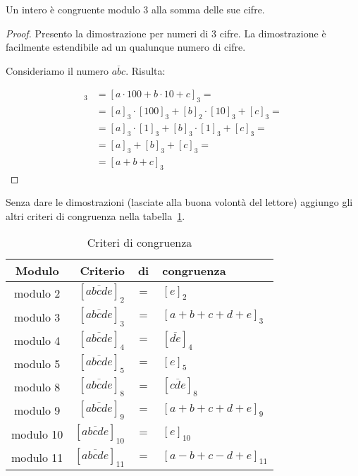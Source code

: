 \begin{mdframed}
    \begin{teorema}
        Un intero è congruente modulo 3 alla somma delle sue cifre.
    \end{teorema}
    \begin{proof}
        Presento la dimostrazione per numeri di 3 cifre. La dimostrazione è facilmente estendibile ad un qualunque numero di cifre.

        Consideriamo il numero $\overline{abc}$. Risulta:

        \begin{align*}
            [\overline{abc}]_3 &= [a \cdot 100 + b \cdot 10 + c]_3 = \\
            &= [a]_3 \cdot [100]_3 + [b]_2 \cdot [10]_3 + [c]_3 = \\
            &= [a]_3 \cdot [1]_3 + [b]_3 \cdot [1]_3 + [c]_3 = \\
            &= [a]_3 + [b]_3 + [c]_3 = \\
            &= [a + b + c]_3
        \end{align*}
    \end{proof}
\end{mdframed}

Senza dare le dimostrazioni (lasciate alla buona volontà del lettore) aggiungo gli altri criteri di congruenza nella tabella~\ref{tab:criteri_congruenza}.

\begin{table}[tp]
    \begin{mdframed}    
        \label{tab:criteri_congruenza}
        \centering
        \begin{tabular}{c|rcl}
            \toprule
            Modulo & Criterio & di & congruenza \\
            \midrule
            modulo 2 & $[\overline{abcde}]_2 $ & $ = $ & $ [e]_2$ \\
            modulo 3 & $[\overline{abcde}]_3 $ & $ = $ & $ [a + b + c + d + e]_3$ \\
            modulo 4 & $[\overline{abcde}]_4 $ & $ = $ & $ [\overline{de}]_4$ \\
            modulo 5 & $[\overline{abcde}]_5 $ & $ = $ & $ [e]_5$ \\
            modulo 8 & $[\overline{abcde}]_8 $ & $ = $ & $ [\overline{cde}]_8$ \\
            modulo 9 & $[\overline{abcde}]_9 $ & $ = $ & $ [a + b + c + d + e]_9$ \\
            modulo 10 & $[\overline{abcde}]_{10} $ & $ = $ & $ [e]_{10}$ \\
            modulo 11 & $[\overline{abcde}]_{11} $ & $ = $ & $ [a - b + c - d + e]_{11}$ \\
            \bottomrule
        \end{tabular}
        \caption{Criteri di congruenza}
    \end{mdframed}
\end{table}

